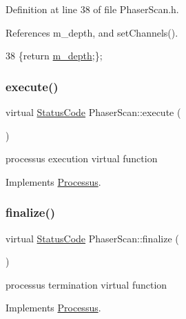 Definition at line 38 of file Phaser\+Scan.\+h.



References m\+\_\+depth, and set\+Channels().


\begin{DoxyCode}
38 \{\textcolor{keywordflow}{return} \hyperlink{classPhaserScan_a445487a8eea9b6d484ae8615cb1bd52d}{m\_depth};\};
\end{DoxyCode}
\mbox{\label{classPhaserScan_abf8e9639bcbbd23ec1a9a8e04319d9d1}} 
\subsubsection{\texorpdfstring{execute()}{execute()}}
{\footnotesize\ttfamily virtual \hyperlink{classStatusCode}{Status\+Code} Phaser\+Scan\+::execute (\begin{DoxyParamCaption}{ }\end{DoxyParamCaption})\hspace{0.3cm}{\ttfamily [virtual]}}

processus execution virtual function 

Implements \hyperlink{classProcessus_a63767a63a1fb0055c5aa45b21a4a5d58}{Processus}.

\mbox{\label{classPhaserScan_a505bd8dc2961fd220f1624cd949a266e}} 
\subsubsection{\texorpdfstring{finalize()}{finalize()}}
{\footnotesize\ttfamily virtual \hyperlink{classStatusCode}{Status\+Code} Phaser\+Scan\+::finalize (\begin{DoxyParamCaption}{ }\end{DoxyParamCaption})\hspace{0.3cm}{\ttfamily [virtual]}}

processus termination virtual function 

Implements \hyperlink{classProcessus_aba93d691f031bdb18ae4b8afb1b2e856}{Processus}.

\mbox{\label{classPhaserScan_aeb0dccb02754b11c19719962f7c43fb8}} 
